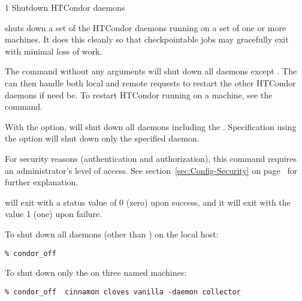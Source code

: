 \begin{ManPage}{\label{man-condor-off}}{1}
{Shutdown HTCondor daemons}
\Synopsis {}
\ToolArgsBase

\ToolDebugOption
\ToolWhere
\ToolArgsAffect


\Description 

 shuts down a set of the HTCondor daemons running on a set of
one or more machines.
It does this cleanly so that checkpointable jobs may gracefully exit with
minimal loss of work.

The command  without any arguments will shut down
all daemons except .
The  can then handle both local and remote
requests to restart the other HTCondor daemons if need be.  To restart
HTCondor running on a machine, see the  command.

With the  option,  will shut down
all daemons including the .
Specification using the  option
will shut down
only the specified daemon.

For security reasons (authentication and authorization),
this command requires an administrator's level of access.
See
section~\ref{sec:Config-Security} on page~\pageref{sec:Config-Security}
for further explanation.

\begin{Options}
	\ToolArgsBaseDesc
	\ToolDebugDesc
	\ToolArgsLocateDesc
	\ToolArgsAffectDesc
\end{Options}

\ExitStatus
{} will exit with a status value of 0 (zero) upon success,
and it will exit with the value 1 (one) upon failure.


\Examples
To shut down all daemons (other than ) on the
local host:
\begin{verbatim}
% condor_off
\end{verbatim}

To shut down only the  on three named machines:
\begin{verbatim}
% condor_off  cinnamon cloves vanilla -daemon collector
\end{verbatim}


\end{ManPage}
